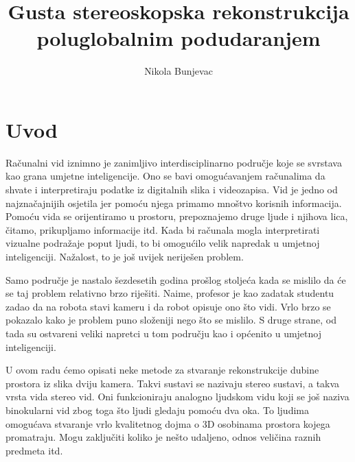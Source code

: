 \documentclass[utf8, zavrsni, numeric]{fer}
\begin{document}
\nocite{*}


\title{Gusta stereoskopska rekonstrukcija poluglobalnim podudaranjem}

\author{Nikola Bunjevac}

\maketitle

\izvornik


\tableofcontents

\chapter{Uvod}
Računalni vid iznimno je zanimljivo interdisciplinarno područje koje se svrstava kao grana umjetne inteligencije.
Ono se bavi omogućavanjem računalima da shvate i interpretiraju podatke iz digitalnih slika i videozapisa.
Vid je jedno od najznačajnijih osjetila jer pomoću njega primamo mnoštvo korisnih informacija.
Pomoću vida se orijentiramo u prostoru, prepoznajemo druge ljude i njihova lica, čitamo, prikupljamo informacije itd.
Kada bi računala mogla interpretirati vizualne podražaje poput ljudi, to bi omogućilo velik
napredak u umjetnoj inteligenciji. Nažalost, to je još uvijek neriješen problem.

Samo područje
je nastalo šezdesetih godina prošlog stoljeća kada se mislilo da će se taj problem relativno brzo riješiti.
Naime, profesor je kao zadatak studentu zadao da na robota stavi kameru i da robot opisuje ono što vidi.
Vrlo brzo se pokazalo kako je problem puno složeniji nego što se mislilo.
S druge strane, od tada su ostvareni veliki napretci u tom području kao i općenito u umjetnoj inteligenciji.

U ovom radu ćemo opisati neke metode za stvaranje rekonstrukcije dubine prostora iz slika dviju kamera. Takvi sustavi se nazivaju stereo sustavi, a takva vrsta vida stereo vid.
Oni funkcioniraju analogno ljudskom vidu koji se još naziva binokularni vid zbog toga što ljudi gledaju pomoću dva oka. To ljudima omogućava stvaranje vrlo kvalitetnog dojma o 3D osobinama prostora kojega promatraju. Mogu zaključiti koliko je nešto udaljeno, odnos veličina raznih predmeta itd.
\end{document}
